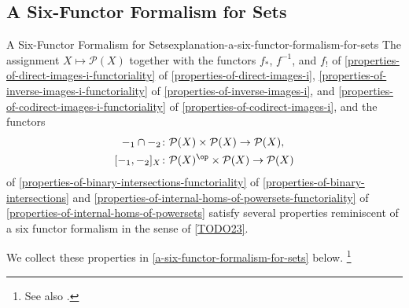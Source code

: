 \subsection{A Six-Functor Formalism for Sets}\label{subsection-a-six-functor-formalism-for-sets}
\begin{explanation}{A Six-Functor Formalism for Sets}{explanation-a-six-functor-formalism-for-sets}%
    The assignment $X\mapsto\mathcal{P}(X)$ together with the functors $f_{*}$, $f^{-1}$, and $f_{!}$ of \cref{properties-of-direct-images-i-functoriality} of \cref{properties-of-direct-images-i}, \cref{properties-of-inverse-images-i-functoriality} of \cref{properties-of-inverse-images-i}, and \cref{properties-of-codirect-images-i-functoriality} of \cref{properties-of-codirect-images-i}, and the functors
    \begin{align*}
        -_{1}\cap-_{2}    &\colon \mathcal{P}(X)\times\mathcal{P}(X) \to \mathcal{P}(X),\\
        [-_{1},-_{2}]_{X} &\colon \mathcal{P}(X)^{\op}\times\mathcal{P}(X) \to \mathcal{P}(X)
    \end{align*}
    of \cref{properties-of-binary-intersections-functoriality} of \cref{properties-of-binary-intersections} and \cref{properties-of-internal-homs-of-powersets-functoriality} of \cref{properties-of-internal-homs-of-powersets} satisfy several properties reminiscent of a six functor formalism in the sense of \cref{TODO23}.

    \indent We collect these properties in \cref{a-six-functor-formalism-for-sets} below.%
    \footnote{%
        See also \cite{nlab:interactions-of-images-and-pre-images-with-unions-and-intersections}.
        \par\vspace*{\TCBBoxCorrection}
    }%
\end{explanation}
